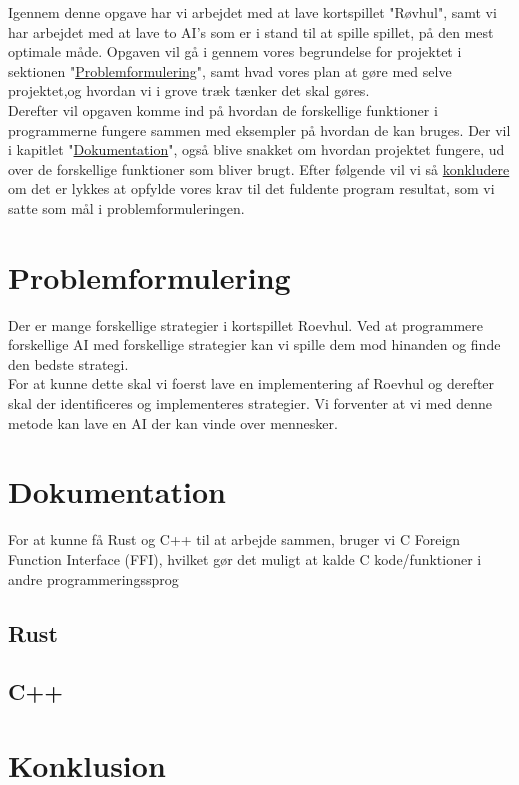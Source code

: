 \documentclass[12pt]{article}
\begin{document}
Igennem denne opgave har vi arbejdet med at lave kortspillet "Røvhul", samt vi har arbejdet med at lave to AI's som er i stand til at spille spillet, på den mest optimale måde. Opgaven vil gå i gennem vores begrundelse for projektet i sektionen "\hyperref[sec:Problemformulering]{Problemformulering}", samt hvad vores plan at gøre med selve projektet,og hvordan vi i grove træk tænker det skal gøres.
\\
Derefter vil opgaven komme ind på hvordan de forskellige funktioner i programmerne fungere sammen med eksempler på hvordan de kan bruges. Der vil i kapitlet "\hyperref[sec:Dokumentation]{Dokumentation}", også blive snakket om hvordan projektet fungere, ud over de forskellige funktioner som bliver brugt. Efter følgende vil vi så \hyperref[sec:Konklusion]{konkludere} om det er lykkes at opfylde vores krav til det fuldente program resultat, som vi satte som mål i problemformuleringen.

\section{Problemformulering} \label{sec:Problemformulering}

Der er mange forskellige strategier i kortspillet Roevhul. Ved at programmere forskellige AI med forskellige strategier kan vi spille dem mod hinanden og finde den bedste strategi.
\\
For at kunne dette skal vi foerst lave en implementering af Roevhul og derefter skal der identificeres og implementeres strategier. Vi forventer at vi med denne metode kan lave en AI der kan vinde over mennesker.

\vfill
\pagebreak

\section{Dokumentation} \label{sec:Dokumentation}
For at kunne få Rust og C++ til at arbejde sammen, bruger vi C Foreign Function Interface (FFI), hvilket gør det muligt at kalde C kode/funktioner i andre programmeringssprog

\subsection{Rust}

\subsection{C++}


\vfill
\pagebreak

\section{Konklusion} \label{sec:Konklusion}

\vfill
\pagebreak
\end{document}
